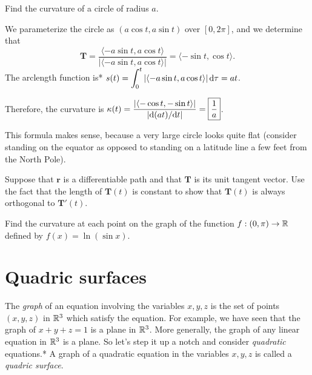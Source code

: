 \documentclass{watsonbook}
\begin{document}
\begin{example}{}{}
  Find the curvature of a circle of radius $a$. 
\end{example}

\begin{solution}
  We parameterize the circle as $(a \cos t, a \sin t)$ over $[0,2\pi]$,
  and we determine that
  \[
    \mathbf{T} = \frac{\langle -a \sin t, a \cos t\rangle }{|\langle
      -a \sin t, a \cos t\rangle|} = \langle -\sin t, \cos t \rangle. 
  \]
  The arclength function is* $s(t) = \displaystyle{\int_0^t |\langle -a \sin t, a \cos
  t\rangle| \, \mathrm{d}\tau} = at$. 

  Therefore, the curvature is $\displaystyle{\kappa(t) = \frac{|\langle -\cos t, -\sin t
  \rangle|}{|\mathrm{d}(at)/\mathrm{d}t|} = \boxed{\frac{1}{a}}}$.

This formula makes sense, because a very large circle looks quite flat
(consider standing on the equator as opposed to standing on a
latitude line a few feet from the North Pole).
\end{solution}

\begin{exercise}{}{}
  Suppose that $\mathbf{r}$ is a differentiable path and that
  $\mathbf{T}$ is its unit tangent vector. Use the fact that the
  length of $\mathbf{T}(t)$ is constant to show that $\mathbf{T}(t)$ is
  always orthogonal to $\mathbf{T}'(t)$.
\end{exercise}

\begin{exercise}{}{}
  Find the curvature at each point on the graph of the function
  $f:(0,\pi) \to \mathbb{R}$ defined by  $f(x) = \ln (\sin x)$. 
\end{exercise}

\section{Quadric surfaces} \label{sec:quadric_surfaces} 

The \textit{graph} of an equation involving the variables $x,y,z$ is
the set of points $(x,y,z)$ in $\mathbb{R}^3$ which satisfy the equation. For
example, we have seen that the graph of $x + y + z = 1$ is a plane in
$\mathbb{R}^3$. More generally, the graph of any linear equation in $\mathbb{R}^3$ is
a plane. So let's step it up a notch and consider \textit{quadratic}
equations.*  A graph of a quadratic
equation in the variables $x,y,z$ is called a \textit{quadric
  surface}. 
\end{document}
